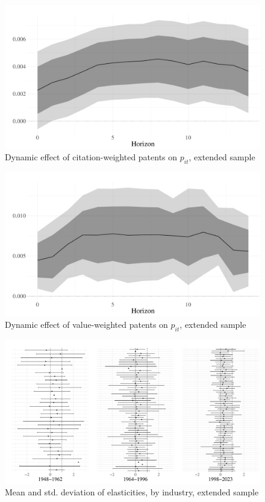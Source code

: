 \documentclass[11pt]{article}
\begin{document}
\begin{figure}
\centering 
\includegraphics[width=.75\textwidth]{../figures/local_projections/patents_citations_resid_hist.pdf}
\caption{Dynamic effect of citation-weighted patents on $p_{it}$, extended sample}
\label{fig:patents_citations_resid_hist}
\end{figure}

\begin{figure}[!h]
\centering 
\includegraphics[width=.75\textwidth]{../figures/local_projections/patents_value_resid_hist.pdf}
\caption{Dynamic effect of value-weighted patents on $p_{it}$, extended sample}
\label{fig:patents_value_resid_hist}
\end{figure}

\begin{figure}[!h]
\centering
\includegraphics[width=.75\textwidth]{../figures/elasticity_est/elasticity_byCode_hist.pdf}
\caption{Mean and std. deviation of elasticities, by industry, extended sample}
\label{fig:theta_byCode_hist}
\end{figure}
\end{document}
